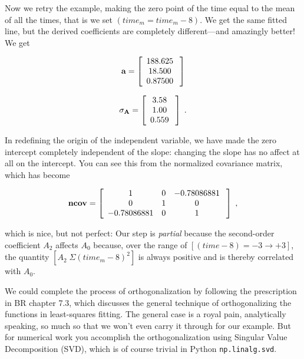 \documentclass[psfig,preprint]{aastex}
\begin{document}
	Now we retry the example, making the zero point of the time
equal to the mean of all the times, that is we set $(time_m = time_m -
8)$. We get the same fitted line, but the derived coefficients are
completely different---and amazingly better! We get

\begin{mathletters}
\begin{eqnarray}
{\bf a} = \left[
\begin{array}{c}
188.625 \\
18.500 \\
0.87500 \\
\end{array} \; \right] 
\end{eqnarray}

\begin{eqnarray}
{\bf \sigma_A} = \left[
\begin{array}{c}
3.58 \\
1.00 \\
0.559 \\
\end{array} \; \right] \; .
\end{eqnarray}
\end{mathletters}

\noindent In redefining the origin of the independent variable, we have
made the zero intercept completely independent of the slope: changing
the slope has no affect at all on the intercept. You can see this from
the normalized covariance matrix, which has become

\begin{eqnarray}
{\bf ncov} = \left[
\begin{array}{ccc}
1  &     0       &   -0.78086881  \\
   0  &  1   &    0  \\
 -0.78086881 &  0  &  1  \\
\end{array} \; \right] \; ,
\end{eqnarray}

\noindent which is nice, but not perfect: Our step is {\it partial}
because the second-order coefficient $A_2$ affects $A_0$ because, over
the range of $[(time - 8) = -3 \rightarrow +3]$, the quantity $[A_2 \;
\Sigma(time_m -8)^2]$ is always positive and is thereby correlated with
$A_0$.

	We could complete the process of orthogonalization by following
the prescription in BR chapter 7.3, which discusses the general
technique of orthogonalizing the functions in least-squares fitting. The
general case is a royal pain, analytically speaking, so much so that we
won't even carry it through for our example. But for numerical work you
accomplish the orthogonalization using Singular Value Decomposition
(SVD), which is of course trivial in Python {\tt np.linalg.svd}.
\end{document}
